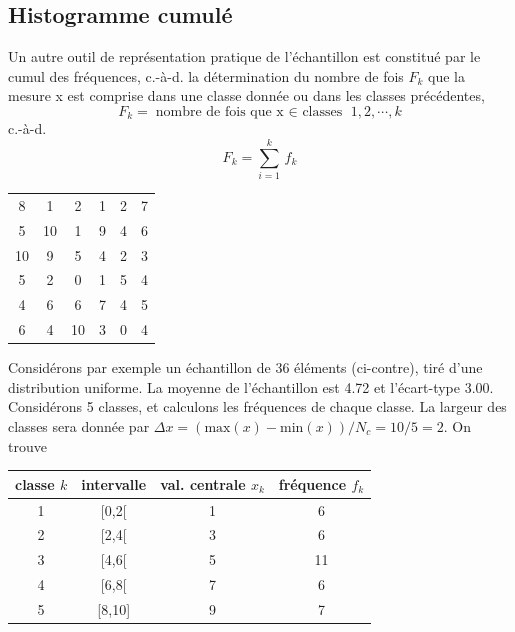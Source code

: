 \documentclass[main.tex]{subfiles}
\begin{document}
\subsection{Histogramme cumulé}

Un autre outil de représentation pratique de l'échantillon est constitué par le cumul des fréquences, c.-à-d. la détermination du nombre de fois $F_k$ que la mesure x est comprise dans une classe donnée ou dans les classes précédentes,
$$
    F_k=\text{nombre de fois que x $\in$ classes } 1,2,\cdots,k
$$
c.-à-d.
\begin{equation}
    F_k=\sum\limits_{i=1}^{k}\,f_k
\end{equation}
\begin{table}
    \centering
    \vspace{-6mm}
    \begin{tabular}{cccccc}
        8  & 1  & 2  & 1 & 2 & 7 \\
        5  & 10 & 1  & 9 & 4 & 6 \\
        10 & 9  & 5  & 4 & 2 & 3 \\
        5  & 2  & 0  & 1 & 5 & 4 \\
        4  & 6  & 6  & 7 & 4 & 5 \\
        6  & 4  & 10 & 3 & 0 & 4
    \end{tabular}
\end{table}
Considérons par exemple un échantillon de 36 éléments (ci-contre), tiré d'une distribution uniforme. La moyenne de l'échantillon est 4.72 et l'écart-type 3.00. Considérons 5 classes, et calculons les fréquences de chaque classe. La largeur des classes sera donnée par $\Delta x=(\text{max}(x)-\text{min}(x))/N_c=10/5=2$. On trouve
\begin{center}
    \begin{tabular}{cccc}
        classe $k$ & intervalle & val. centrale $x_k$ & fréquence $f_k$ \\\hline
        1          & [0,2[      & 1                   & 6               \\
        2          & [2,4[      & 3                   & 6               \\
        3          & [4,6[      & 5                   & 11              \\
        4          & [6,8[      & 7                   & 6               \\
        5          & [8,10]     & 9                   & 7               \\\hline
    \end{tabular}
\end{center}
\end{document}
